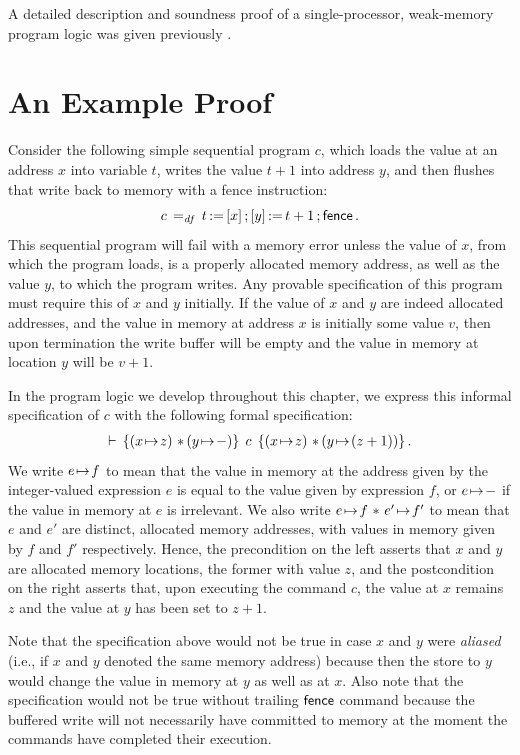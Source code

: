 \documentclass[11pt]{report}
\begin{document}
A detailed description and soundness proof of a single-processor, weak-memory program logic was given previously \cite{wmsldetails}. 

\section{An Example Proof}

Consider the following simple sequential program $c$, which loads the value at an address $x$ into variable $t$, writes the value $t+1$ into address $y$, and then flushes that write back to memory with a fence instruction: \[ c \operatorname{\;=_{\mathit{df}}\;} t \operatorname{:\!=} \left[ x \right] \operatorname{;} \left[ y \right] \operatorname{:\!=} t+1 \operatorname{;} \operatorname{\mathsf{fence}}.\] This sequential program will fail with a memory error unless the value of $x$, from which the program loads, is a properly allocated memory address, as well as the value $y$, to which the program writes. Any provable specification of this program must require this of $x$ and $y$ initially. If the value of $x$ and $y$ are indeed allocated addresses, and the value in memory at address $x$ is initially some value $v$, then upon termination the write buffer will be empty and the value in memory at location $y$ will be $v+1$. 

In the program logic we develop throughout this chapter, we express this informal specification of $c$ with the following formal specification: \begin{align}\label{eq:seq-ex-spec} \triple{(x \fpointsto z) \fsep (y \fpointsto -)}{c}{(x \fpointsto z) \fsep (y \fpointsto (z + 1))}.\end{align}
We write $e \!\mapsto\! f$ to mean that the value in memory at the address given by the integer-valued expression $e$ is equal to the value given by expression $f$, or $e \!\mapsto\! -$ if the value in memory at $e$ is irrelevant. We also write $e \!\mapsto\! f \operatorname{\,\ast\,} e' \!\mapsto\! f'$ to mean that $e$ and $e'$ are distinct, allocated memory addresses, with values in memory given by $f$ and $f'$ respectively. Hence, the precondition on the left asserts that $x$ and $y$ are allocated memory locations, the former with value $z$, and the postcondition on the right asserts that, upon executing the command $c$, the value at $x$ remains $z$ and the value at $y$ has been set to $z+1$. 

Note that the specification above would not be true in case $x$ and $y$ were \emph{aliased} (i.e., if $x$ and $y$ denoted the same memory address) because then the store to $y$ would change the value in memory at $y$ as well as at $x$. Also note that the specification would not be true without trailing $\operatorname{\mathsf{fence}}$ command because the buffered write will not necessarily have committed to memory at the moment the commands have completed their execution. 
\end{document}
